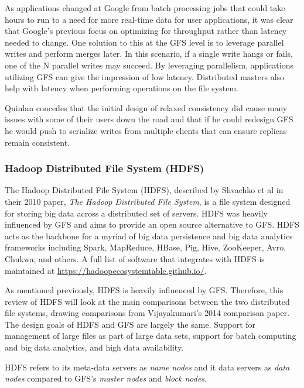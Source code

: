 \documentclass[]{article}
\begin{document}
As applications changed at Google from batch processing jobs that could take hours to run to a need for more real-time data for user applications, it was clear that Google's previous focus on optimizing for throughput rather than latency needed to change. One solution to this at the GFS level is to leverage parallel writes and perform merges later. In this scenario, if a single write hangs or fails, one of the N parallel writes may succeed. By leveraging parallelism, applications utilizing GFS can give the impression of low latency. Distributed masters also help with latency when performing operations on the file system.

Quinlan concedes that the initial design of relaxed consistency did cause many issues with some of their users down the road and that if he could redesign GFS he would push to serialize writes from multiple clients that can ensure replicas remain consistent.

\subsubsection{Hadoop Distributed File System (HDFS)}\label{sssec:hadoop-distributed-file-system}
The Hadoop Distributed File System (HDFS), described by Shvachko et al in their 2010 paper, \textit{The Hadoop Distributed File System}\cite{shvachko_hadoop_2010}, is a file system designed for storing big data across a distributed set of servers. HDFS was heavily influenced by GFS and aims to provide an open source alternative to GFS. HDFS acts as the backbone for a myriad of big data persistence and big data analytics frameworks including Spark, MapReduce, HBase, Pig, Hive, ZooKeeper, Avro, Chukwa, and others. A full list of software that integrates with HDFS is maintained at \url{https://hadoopecosystemtable.github.io/}\cite{hadoop-ecosystem}. 

As mentioned previously, HDFS is heavily influenced by GFS. Therefore, this review of HDFS will look at the main comparisons between the two distributed file systems, drawing comparisons from Vijayakumari's 2014 comparison paper\cite{vijayakumari_comparative_2014}. The design goals of HDFS and GFS are largely the same. Support for management of large files as part of large data sets, support for batch computing and big data analytics, and high data availability.

HDFS refers to its meta-data servers as \textit{name nodes} and it data servers as \textit{data nodes} compared to GFS's \textit{master nodes} and \textit{block nodes}.
\end{document}
